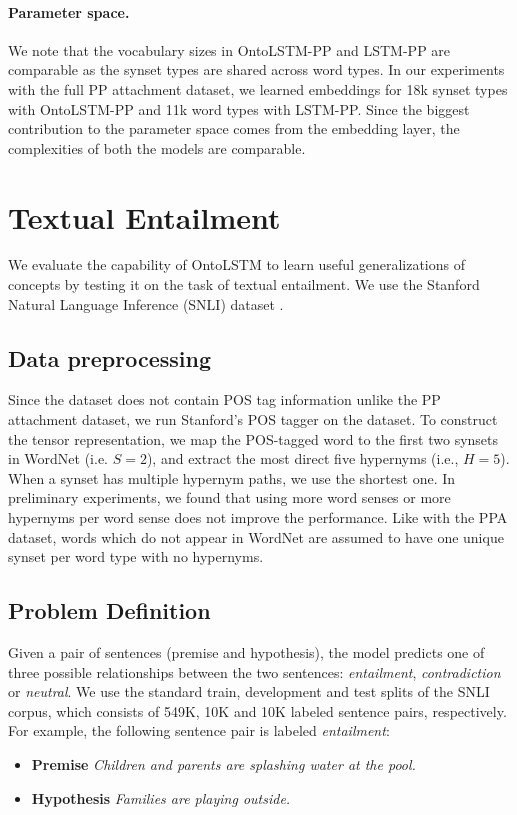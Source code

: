 \paragraph{Parameter space.} We note that the vocabulary sizes in OntoLSTM-PP and LSTM-PP are comparable as the synset types are shared across word types. 
In our experiments with the full PP attachment dataset, we learned embeddings for 18k synset types with OntoLSTM-PP and 11k word types with LSTM-PP\@. Since the biggest contribution to the parameter space comes from the embedding layer,
the complexities of both the models are comparable.

\section{Textual Entailment}
\label{sec:ontolstm_snli}
We evaluate the capability of OntoLSTM to learn useful generalizations of concepts by testing it on
the task of textual entailment. We use the Stanford Natural Language Inference (SNLI) dataset \citep{bowman:15}.

\subsection{Data preprocessing} Since the dataset does not contain POS tag information unlike the PP attachment dataset,
we run Stanford's POS tagger \citep{toutanova:03} on the dataset.
To construct the tensor representation, we map the POS-tagged word to the first 
two synsets in WordNet (i.e. $S=2$), and extract the most direct five hypernyms 
(i.e., $H=5$). When a synset has multiple hypernym paths, we use the shortest 
one. In preliminary experiments, we found that using more word senses or more 
hypernyms per word sense does not improve the performance.
Like with the PPA dataset, words which do not appear in WordNet are assumed to
have one unique synset per word type with no hypernyms.

\subsection{Problem Definition}
Given a pair of sentences (premise and hypothesis), the model predicts one of 
three possible relationships between the two sentences: \textit{entailment}, 
\textit{contradiction} or \textit{neutral}.
We use the standard train, development and test splits of the SNLI corpus, which 
consists of 549K, 10K and 10K labeled sentence pairs, respectively.
For example, the following sentence pair is labeled \textit{entailment}:
 \begin{itemize}
  \item \textbf{Premise} \textit{Children and parents are splashing water at the 
pool.}
  \item \textbf{Hypothesis} \textit{Families are playing outside.}
 \end{itemize}
 
